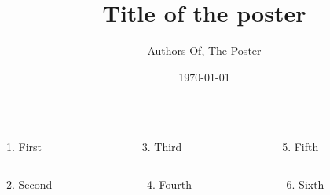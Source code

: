 \documentclass[final]{beamer}
\title{Title of the poster}
\author{Authors Of, The Poster}
\institute[University of Bristol]{Department of Computer Science, University of Bristol}
\date{\today}
\begin{document}
  \begin{frame}{}
    \vfill
    \begin{columns}[t]

      \begin{column}{0.25\linewidth}
        \begin{block}{1. First}
          \scriptsize{\lipsum[1]}
        \end{block}
      \end{column}

      \begin{column}{0.25\linewidth}
        \begin{block}{3. Third}
          \scriptsize{\lipsum[2]}
        \end{block}
      \end{column}

      \begin{column}{0.4\linewidth}
        \begin{block}{5. Fifth}
          \scriptsize{\lipsum[3]}
        \end{block}
      \end{column}

    \end{columns}
    \vfill
    \begin{columns}[t]

      \begin{column}{0.25\linewidth}
        \begin{block}{2. Second}
          \scriptsize{\lipsum[4]}
        \end{block}
      \end{column}

      \begin{column}{0.3\linewidth}
        \begin{block}{4. Fourth}
          \scriptsize{\lipsum[5]}
        \end{block}
      \end{column}

      \begin{column}{0.35\linewidth}
        \begin{block}{6. Sixth}
          \scriptsize{\lipsum[6]}
        \end{block}
      \end{column}

    \end{columns}
  \end{frame}
\end{document}
